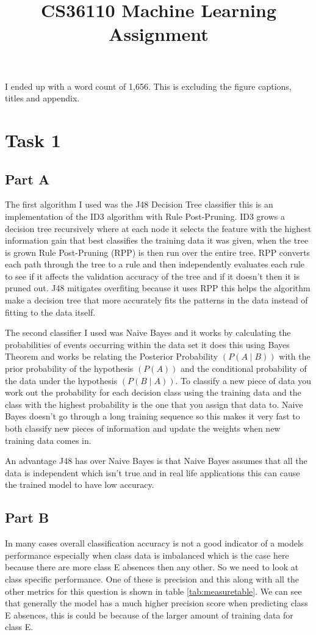 \documentclass[10pt]{article}
\title {CS36110 Machine Learning Assignment}
\date{}                                           %
\begin{document}
\maketitle

I ended up with a word count of 1,656. This is excluding the figure captions, titles and appendix.

\section*{Task 1}

\subsection*{Part A}
The first algorithm I used was the J48 Decision Tree classifier this is an implementation of the ID3 algorithm with Rule Post-Pruning. ID3 grows a decision tree recursively where at each node it selects the feature with the highest information gain that best classifies the training data it was given, when the tree is grown Rule Post-Pruning (RPP) is then run over the entire tree. RPP converts each path through the tree to a rule and then independently evaluates each rule to see if it affects the validation accuracy of the tree and if it doesn't then it is pruned out. J48 mitigates overfiting because it uses RPP this helps the algorithm make a decision tree that more accurately fits the patterns in the data instead of fitting to the data itself.

The second classifier I used was Naive Bayes and it works by calculating the probabilities of events occurring within the data set it does this using Bayes Theorem and works be relating the Posterior Probability $(P(A \mid B))$ with the prior probability of the hypothesis $(P(A))$ and the conditional probability of the data under the hypothesis $(P(B \mid A))$. To classify a new piece of data you work out the probability for each decision class using the training data and the class with the highest probability is the one that you assign that data to. Naive Bayes doesn't go through a long training sequence so this makes it very fast to both classify new pieces of information and update the weights when new training data comes in.

An advantage J48 has over Naive Bayes is that Naive Bayes assumes that all the data is independent which isn't true and in real life applications this can cause the trained model to have low accuracy.

\subsection*{Part B}
In many cases overall classification accuracy is not a good indicator of a models performance especially when class data is imbalanced which is the case here because there are more class E absences then any other. So we need to look at class specific performance. One of these is precision and this along with all the other metrics for this question is shown in table \ref{tab:measuretable}. We can see that generally the model has a much higher precision score when predicting class E absences, this is could be because of the larger amount of training data for class E.
\end{document}
